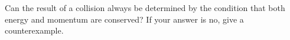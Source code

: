 Can the result of a collision always be determined by the condition that
both energy and momentum are conserved? If your answer is no, give a
counterexample.
